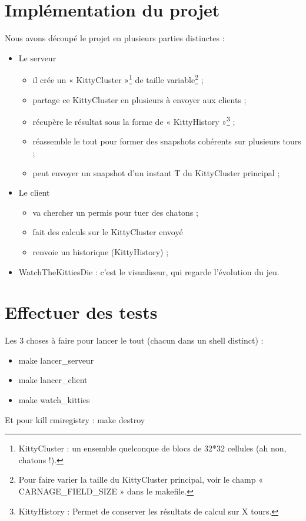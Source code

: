 \documentclass[twoside]{article}
\begin{document}
\section{Implémentation du projet}
Nous avons découpé le projet en plusieurs parties distinctes : 
\begin{itemize}
	\item Le serveur 
		\begin{itemize}
			\item il crée un « KittyCluster »\protect\footnote{
					KittyCluster : un ensemble quelconque de blocs de 32*32 cellules (ah non, chatons !).
				} de taille variable\protect\footnote{
					Pour faire varier la taille du KittyCluster principal, 
						 voir le champ « CARNAGE\_FIELD\_SIZE » dans le makefile.
				} ;
			\item partage ce KittyCluster en plusieurs à envoyer aux clients ;
			\item récupère le résultat sous la forme de « KittyHistory »\protect\footnote{
					KittyHistory : Permet de conserver les résultats de calcul sur X tours.
				}	;
			\item réassemble le tout pour former des snapshots cohérents sur plusieurs tours ;
			\item peut envoyer un snapshot d'un instant T du KittyCluster principal ;
		\end{itemize}
	\item Le client
		\begin{itemize}
			\item va chercher un permis pour tuer des chatons ;
			\item fait des calculs sur le KittyCluster envoyé  
			\item renvoie un historique (KittyHistory) ;
		\end{itemize}
	\item WatchTheKittiesDie : c'est le visualiseur, qui regarde l'évolution du jeu.
\end{itemize}

\section{Effectuer des tests}
Les 3 choses à faire pour lancer le tout (chacun dans un shell distinct) :
\begin{itemize}
	\item make lancer\_serveur
	\item make lancer\_client
	\item make watch\_kitties
\end{itemize}
Et pour kill rmiregistry :
	make destroy


\end{document}
